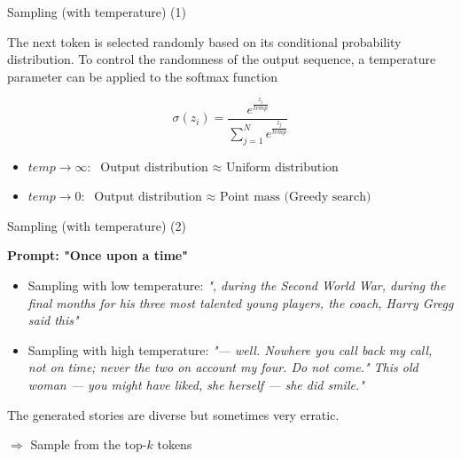 \begin{vbframe}{Sampling (with temperature) (1)}



The next token is selected randomly based on its conditional probability distribution. To control the randomness of the output sequence, a temperature parameter can be applied to the softmax function

\vfill 

$$
\sigma\left(z_i\right)=\frac{e^{\frac{z_i}{temp}}}{\sum_{j=1}^N e^{\frac{z_j}{temp}}}
$$

\vfill

\begin{itemize}
\item $temp \rightarrow \infty: \text{ Output distribution $\approx$ Uniform distribution}$
\item $temp \rightarrow 0: \text{ Output distribution $\approx$ Point mass (Greedy search) }$
\end{itemize}



\end{vbframe}


\begin{vbframe}{Sampling (with temperature) (2)}

\vfill

\textbf{Prompt: "Once upon a time"}
\begin{itemize}
\item Sampling with low temperature: \textit{", during the Second World War, during the final months for his three most talented young players, the coach, Harry Gregg said this"}
\item Sampling with high temperature: \textit{"— well. Nowhere you call back my call, not on time; never the two on account my four. Do not come." This old woman — you might have liked, she herself — she did smile."}
\end{itemize}

The generated stories are diverse but sometimes very erratic.\\

\vfill

$\Rightarrow$ Sample from the top-$k$ tokens     

\end{vbframe}


